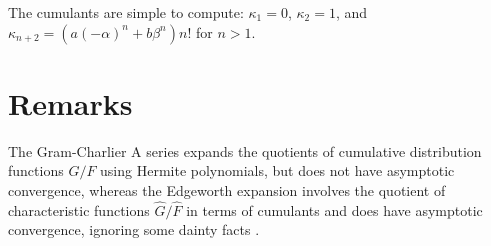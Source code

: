 \documentclass[11pt]{article}
\begin{document}
The cumulants are simple to compute: \(\kappa_1 = 0\), \(\kappa_2 = 1\),
and \(\kappa_{n+2} = (a(-\alpha)^n + b\beta^n)n!\) for \(n > 1\).

\section{Remarks}
The Gram-Charlier A series expands the quotients of cumulative
distribution functions \(G/F\) using Hermite polynomials,
but does not have asymptotic convergence, whereas the Edgeworth expansion
involves the quotient of characteristic functions 
\(\hat G/\hat F\) in terms of cumulants and does have asymptotic convergence, ignoring some dainty facts \cite{Petrov}.
\end{document}
